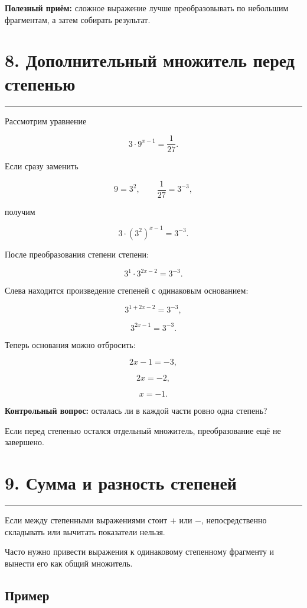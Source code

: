 \documentclass[a4paper,12pt]{article}
\newcommand{\sectionline}{\par\vspace{0.15em}\noindent\textcolor{accent}{\rule{\linewidth}{0.7pt}}\par\vspace{0.2em}}
\newcommand{\key}[1]{\textcolor{darkaccent}{\textbf{#1}}}
\begin{document}
\key{Полезный приём:}
сложное выражение лучше преобразовывать по небольшим фрагментам, а затем собирать результат.


\section*{8. Дополнительный множитель перед степенью}
\sectionline

Рассмотрим уравнение

\[
3\cdot9^{x-1}=\frac1{27}.
\]

Если сразу заменить

\[
9=3^2,
\qquad
\frac1{27}=3^{-3},
\]

получим

\[
3\cdot\left(3^2\right)^{x-1}=3^{-3}.
\]

После преобразования степени степени:

\[
3^1\cdot3^{2x-2}=3^{-3}.
\]

Слева находится произведение степеней с одинаковым основанием:

\[
3^{1+2x-2}=3^{-3},
\]

\[
3^{2x-1}=3^{-3}.
\]

Теперь основания можно отбросить:

\[
2x-1=-3,
\]

\[
2x=-2,
\]

\[
\boxed{x=-1}.
\]

\key{Контрольный вопрос:}
осталась ли в каждой части ровно одна степень?

Если перед степенью остался отдельный множитель, преобразование ещё не завершено.


\section*{9. Сумма и разность степеней}
\sectionline

Если между степенными выражениями стоит \(+\) или \(-\), непосредственно складывать или вычитать показатели нельзя.

Часто нужно привести выражения к одинаковому степенному фрагменту и вынести его как общий множитель.

\subsection*{Пример}
\end{document}
